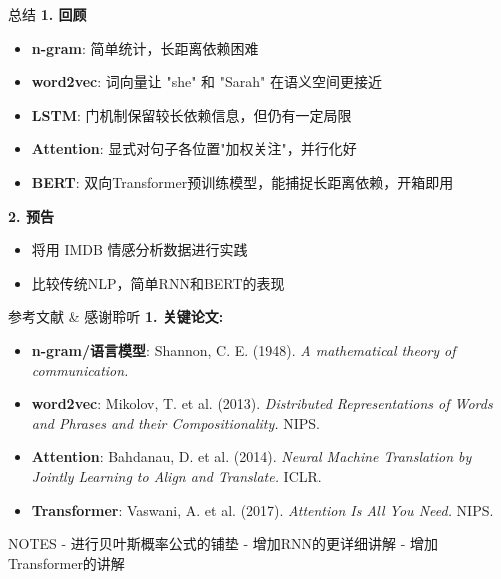 \documentclass{beamer}
\begin{document}
\begin{frame}{总结}
  \textbf{1. 回顾}
  \begin{itemize}
    \item \textbf{n-gram}: 简单统计，长距离依赖困难
    \item \textbf{word2vec}: 词向量让 "she" 和 "Sarah" 在语义空间更接近
    \item \textbf{LSTM}: 门机制保留较长依赖信息，但仍有一定局限
    \item \textbf{Attention}: 显式对句子各位置"加权关注"，并行化好
    \item \textbf{BERT}: 双向Transformer预训练模型，能捕捉长距离依赖，开箱即用

  \end{itemize}

  \textbf{2. 预告}
  \begin{itemize}
    \item 将用 IMDB 情感分析数据进行实践
    \item 比较传统NLP，简单RNN和BERT的表现
  \end{itemize}
\end{frame}

\begin{frame}{参考文献 \& 感谢聆听}
  \textbf{1. 关键论文:}
  \begin{itemize}
    \item \textbf{n-gram/语言模型}: Shannon, C. E. (1948). \emph{A mathematical theory of communication.}
    \item \textbf{word2vec}: Mikolov, T. et al. (2013). \emph{Distributed Representations of Words and Phrases and their Compositionality.} NIPS.
    \item \textbf{Attention}: Bahdanau, D. et al. (2014). \emph{Neural Machine Translation by Jointly Learning to Align and Translate.} ICLR.
    \item \textbf{Transformer}: Vaswani, A. et al. (2017). \emph{Attention Is All You Need.} NIPS.
  \end{itemize}
\end{frame}

\begin{frame}{NOTES}
  - 进行贝叶斯概率公式的铺垫
  - 增加RNN的更详细讲解
  - 增加Transformer的讲解

  
\end{frame}
\end{document}
